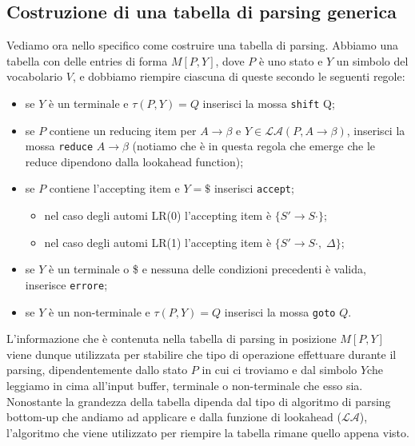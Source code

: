 \documentclass[class=book, crop=false, oneside, 12pt]{standalone}
\begin{document}
\subsection{Costruzione di una tabella di parsing generica}
Vediamo ora nello specifico come costruire una tabella di parsing. Abbiamo una tabella con delle entries di forma \(M[P, Y]\), dove \(P\) è uno stato e \(Y\) un simbolo del vocabolario \(V\), e dobbiamo riempire ciascuna di queste secondo le seguenti regole:
\begin{itemize}
    \item se \(Y\) è un terminale e \(\tau (P,Y) = Q\) inserisci la mossa \texttt{shift} Q;
    \item se \(P\) contiene un reducing item per \(A \to \beta\) e \(Y \in \mathcal{LA}(P, A \to \beta)\), inserisci la mossa \texttt{reduce} \(A \to \beta\) (notiamo che è in questa regola che emerge che le reduce dipendono dalla lookahead function);
    \item se \(P\) contiene l'accepting item e \(Y=\$\) inserisci \texttt{accept};
        \begin{itemize}
            \item nel caso degli automi LR(0) l'accepting item è \(\{S' \to S \cdot\}\);
            \item nel caso degli automi LR(1) l'accepting item è \(\{S' \to S \cdot, \; \Delta\}\);
        \end{itemize}
\item se \(Y\) è un terminale o \$ e nessuna delle condizioni precedenti è valida, inserisce \texttt{errore};
    \item se \(Y\) è un non-terminale e \(\tau (P, Y) = Q\) inserisci la mossa \texttt{goto} \(Q\).
\end{itemize}
L'informazione che è contenuta nella tabella di parsing in posizione \(M[P, Y]\) viene dunque utilizzata per stabilire che tipo di operazione effettuare durante il parsing, dipendentemente dallo stato \(P\) in cui ci troviamo e dal simbolo \(Y\)che leggiamo in cima all'input buffer, terminale o non-terminale che esso sia. Nonostante la grandezza della tabella dipenda dal tipo di algoritmo di parsing bottom-up che andiamo ad applicare e dalla funzione di lookahead (\(\mathcal{LA}\)), l'algoritmo che viene utilizzato per riempire la tabella rimane quello appena visto.
\end{document}
